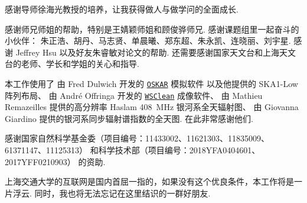 
\begin{thanks}

感谢导师徐海光教授的培养，让我获得做人与做学问的全面成长.

感谢师兄师姐的帮助，特别是王婧颖师姐和顾俊骅师兄.
感谢课题组里一起奋斗的小伙伴：
朱正浩、胡丹、马志贤、单晨曦、郑东超、朱永凯、连晓丽、刘宇星.
感谢 Jeffrey Hsu 以及好友朱睿敏对论文的帮助.
还需要感谢国家天文台和上海天文台的老师、学长和学姐的关心和指导.

本工作使用了
由 Fred Dulwich 开发的
\href{https://github.com/OxfordSKA/OSKAR}{\texttt{OSKAR}} 模拟软件
以及他提供的 SKA1-Low 阵列布局、
由 André Offringa 开发的
\href{https://sourceforge.net/projects/wsclean/}{\texttt{WSClean}} 成像软件、
由 Mathieu Remazeilles 提供的高分辨率 Haslam \SI{408}{\MHz} 银河系全天辐射图、
由 Giovanna Giardino 提供的银河系同步辐射谱指数的全天图.
在此非常感谢他们.

感谢国家自然科学基金委（项目编号：11433002、11621303、11835009、61371147、11125313）
和科学技术部（项目编号：2018YFA0404601、2017YFF0210903）
的资助.

上海交通大学的互联网是国内首屈一指的，如果没有这个优良条件，本工作将是一片浮云.
同时，我也将无法忘记在这里结识的一群好朋友.


\end{thanks}
